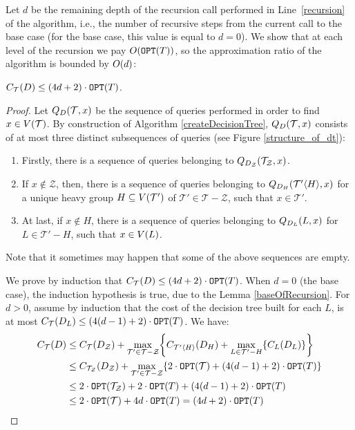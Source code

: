 Let $d$ be the remaining depth of the recursion call performed in Line~\ref{recursion} of the algorithm, i.e., the number of recursive steps from the current call to the base case (for the base case, this value is equal to $d=0$). We show that at each level of the recursion we pay $O\mathopen{}\left( \texttt{OPT}\mathopen{}\left( T \right) \right)$, so the approximation ratio of the algorithm is bounded by $O\mathopen{}\left( d \right)$:
\begin{lemma}\label{costofthesolution}
$C_{\mathcal{T}}\mathopen{}\left( D \right)\leq\mathopen{}\left( 4 d+2 \right)\cdot\texttt{OPT}\mathopen{}\left( T \right)$.
    \begin{proof}
        
    Let $Q_D\mathopen{}\left( \mathcal{T},x \right)$ be the sequence of queries performed in order to find $x\in V\mathopen{}\left( \mathcal{T} \right)$. By construction of Algorithm \ref{createDecisionTree}, $Q_D\mathopen{}\left( \mathcal{T},x \right)$ consists of at most three distinct subsequences of queries (see Figure \ref{structure_of_dt}):
    \begin{enumerate}
        \item Firstly, there is a sequence of queries belonging to $Q_{D_{\mathcal{Z}}}\mathopen{}\left( \mathcal{T}_{\mathcal{Z}},x \right)$.
        \item If $x\notin \mathcal{Z}$, then, there is a sequence of queries belonging to $Q_{D_{H}}\mathopen{}\left( \mathcal{T}'\mathopen{}\langle H \rangle,x \right)$ for a unique heavy group $H\subseteq V\mathopen{}\left( \mathcal{T}' \right)$ of $\mathcal{T}'\in\mathcal{T}-\mathcal{Z}$, such that $x\in \mathcal{T}'$.
        \item At last, if $x\notin H$, there is a sequence of queries belonging to $Q_{D_{L}}\mathopen{}\left( L,x \right)$ for $L\in \mathcal{T}'-H$, such that $x\in V\mathopen{}\left( L \right)$. 
    \end{enumerate}  

    Note that it sometimes may happen that some of the above sequences are empty.
    
    We prove by induction that $C_{\mathcal{T}}\mathopen{}\left( D \right)\leq \mathopen{}\left( 4d +2 \right)\cdot \texttt{OPT}\mathopen{}\left( T \right)$. When $d=0$ (the base case), the induction hypothesis is true, due to the Lemma \ref{baseOfRecursion}. For $d>0$, assume by induction that the cost of the decision tree  built for each $L$, is at most $C_{\mathcal{T}}\mathopen{}\left( D_L \right)\leq \mathopen{}\left( 4\mathopen{}\left( d-1 \right) +2 \right)\cdot \texttt{OPT}\mathopen{}\left( T \right)$. We have:
        \begin{align*}
        C_{\mathcal{T}}\mathopen{}\left( D \right)
        &\leq
        C_{\mathcal{T}}\mathopen{}\left( D_{\mathcal{Z}} \right)+\max_{\mathcal{T}'\in \mathcal{T}-\mathcal{Z}}\mathopen{}\left\{ C_{\mathcal{T}'\mathopen{}\langle H \rangle}\mathopen{}\left( D_H \right)+\max_{L\in \mathcal{T}'-H}\mathopen{}\left\{ C_{L}\mathopen{}\left( D_L \right) \right\} \right\}
         \\ 
        &\leq
        C_{\mathcal{T}_{\mathcal{Z}}}\mathopen{}\left( D_{\mathcal{Z}} \right)+\max_{\mathcal{T}'\in \mathcal{T}-\mathcal{Z}}\mathopen{}\left\{ 2\cdot\texttt{OPT}\mathopen{}\left( \mathcal{T} \right)+\mathopen{}\left( 4\mathopen{}\left( d-1 \right) +2 \right)\cdot \texttt{OPT}\mathopen{}\left( T \right) \right\}
        \\ 
        &\leq 
        2\cdot\texttt{OPT}\mathopen{}\left( \mathcal{T}_{\mathcal{Z}} \right)+2\cdot\texttt{OPT}\mathopen{}\left( T \right)+ \mathopen{}\left( 4\mathopen{}\left( d-1 \right) +2 \right)\cdot \texttt{OPT}\mathopen{}\left( T \right) 
        \\
        &
        \leq 
        2\cdot\texttt{OPT}\mathopen{}\left( \mathcal{T} \right)+4d\cdot \texttt{OPT}\mathopen{}\left( T \right) = \mathopen{}\left( 4d+2 \right)\cdot \texttt{OPT}\mathopen{}\left( T \right)
        \end{align*}
        

\end{proof}
\end{lemma}
